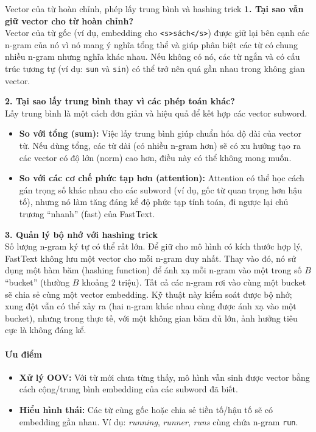 \begin{deepdive}{Vector của từ hoàn chỉnh, phép lấy trung bình và hashing trick}
\textbf{1. Tại sao vẫn giữ vector cho từ hoàn chỉnh?} \\
Vector của từ gốc (ví dụ, embedding cho \texttt{<s>sách</s>}) được giữ lại bên cạnh các n-gram của nó vì nó mang ý nghĩa tổng thể và giúp phân biệt các từ có chung nhiều n-gram nhưng nghĩa khác nhau. Nếu không có nó, các từ ngắn và có cấu trúc tương tự (ví dụ: \texttt{sun} và \texttt{sin}) có thể trở nên quá gần nhau trong không gian vector.

\textbf{2. Tại sao lấy trung bình thay vì các phép toán khác?} \\
Lấy trung bình là một cách đơn giản và hiệu quả để kết hợp các vector subword.
\begin{itemize}
    \item \textbf{So với tổng (sum):} Việc lấy trung bình giúp chuẩn hóa độ dài của vector từ. Nếu dùng tổng, các từ dài (có nhiều n-gram hơn) sẽ có xu hướng tạo ra các vector có độ lớn (norm) cao hơn, điều này có thể không mong muốn.
    \item \textbf{So với các cơ chế phức tạp hơn (attention):} Attention có thể học cách gán trọng số khác nhau cho các subword (ví dụ, gốc từ quan trọng hơn hậu tố), nhưng nó làm tăng đáng kể độ phức tạp tính toán, đi ngược lại chủ trương “nhanh” (fast) của FastText.
\end{itemize}

\textbf{3. Quản lý bộ nhớ với hashing trick} \\
Số lượng n-gram ký tự có thể rất lớn. Để giữ cho mô hình có kích thước hợp lý, FastText không lưu một vector cho mỗi n-gram duy nhất. Thay vào đó, nó sử dụng một hàm băm (hashing function) để ánh xạ mỗi n-gram vào một trong số $B$ “bucket” (thường $B$ khoảng 2 triệu). Tất cả các n-gram rơi vào cùng một bucket sẽ chia sẻ cùng một vector embedding. Kỹ thuật này kiểm soát được bộ nhớ; xung đột vẫn có thể xảy ra (hai n-gram khác nhau cùng được ánh xạ vào một bucket), nhưng trong thực tế, với một không gian băm đủ lớn, ảnh hưởng tiêu cực là không đáng kể.
\end{deepdive}

\paragraph{Ưu điểm}
\begin{itemize}
    \item \textbf{Xử lý OOV:} Với từ mới chưa từng thấy, mô hình vẫn sinh được vector bằng cách cộng/trung bình embedding của các subword đã biết.
    \item \textbf{Hiểu hình thái:} Các từ cùng gốc hoặc chia sẻ tiền tố/hậu tố sẽ có embedding gần nhau.  
    Ví dụ: \textit{running}, \textit{runner}, \textit{runs} cùng chứa n-gram \verb|run|.
\end{itemize}

